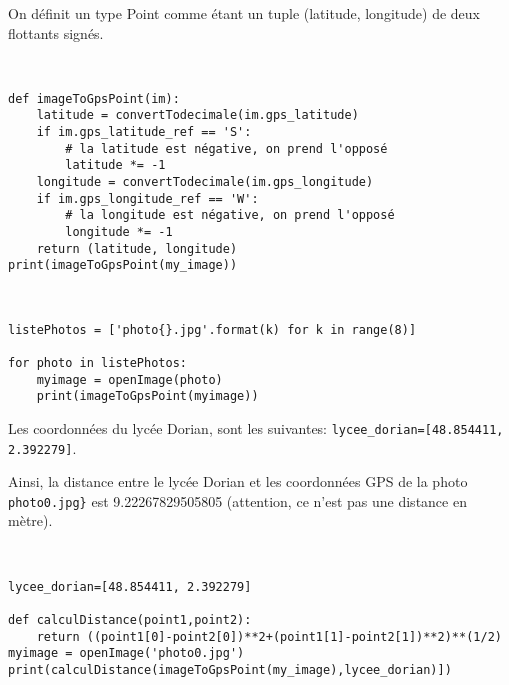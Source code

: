 On définit un type Point comme étant un tuple (latitude, longitude) de deux flottants signés.



\begin{solution}~\ \\
\begin{verbatim}
def imageToGpsPoint(im):
    latitude = convertTodecimale(im.gps_latitude)
    if im.gps_latitude_ref == 'S':
        # la latitude est négative, on prend l'opposé
        latitude *= -1
    longitude = convertTodecimale(im.gps_longitude)
    if im.gps_longitude_ref == 'W':
        # la longitude est négative, on prend l'opposé
        longitude *= -1
    return (latitude, longitude)
print(imageToGpsPoint(my_image))
\end{verbatim}
\end{solution}


\begin{solution}~\ \\
\begin{verbatim}
listePhotos = ['photo{}.jpg'.format(k) for k in range(8)]

for photo in listePhotos:
    myimage = openImage(photo)
    print(imageToGpsPoint(myimage))
\end{verbatim}
\end{solution}

Les coordonnées du lycée Dorian, sont les suivantes:
\verb?lycee_dorian=[48.854411, 2.392279]?.


Ainsi, la distance entre le lycée Dorian et les coordonnées GPS de la photo \verb?photo0.jpg}? est 9.22267829505805 (attention, ce n'est pas une distance en mètre).

\begin{solution}~\ \\
\begin{verbatim}
lycee_dorian=[48.854411, 2.392279]

def calculDistance(point1,point2):
    return ((point1[0]-point2[0])**2+(point1[1]-point2[1])**2)**(1/2)
myimage = openImage('photo0.jpg')
print(calculDistance(imageToGpsPoint(my_image),lycee_dorian)])
\end{verbatim}
\end{solution}

